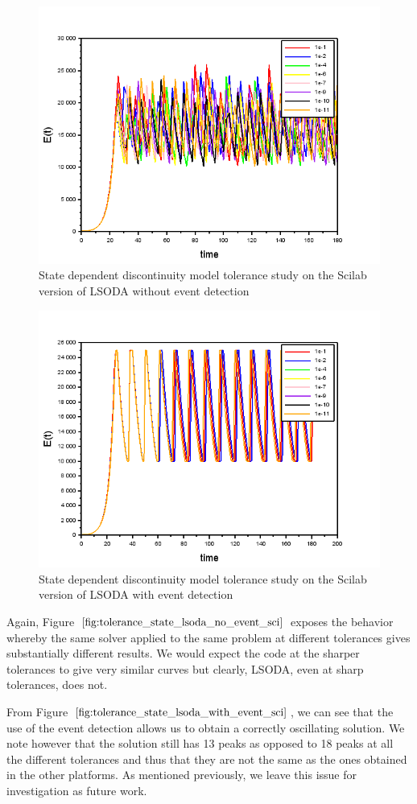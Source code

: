 \begin{figure}[h]
\centering
\includegraphics[width=0.7\linewidth]{./figures/tolerance_state_lsoda_no_event_sci}
\caption{State dependent discontinuity model tolerance study on the Scilab version of LSODA without event detection}
\label{fig:tolerance_state_lsoda_no_event_sci}
\end{figure}

\begin{figure}[h]
\centering
\includegraphics[width=0.7\linewidth]{./figures/tolerance_state_lsoda_with_event_sci}
\caption{State dependent discontinuity model tolerance study on the Scilab version of LSODA with event detection}
\label{fig:tolerance_state_lsoda_with_event_sci}
\end{figure}

Again, Figure $\ref{fig:tolerance_state_lsoda_no_event_sci}$ exposes the behavior whereby the same solver applied to the same problem at different tolerances gives substantially different results. We would expect the code at the sharper tolerances to give very similar curves but clearly, LSODA, even at sharp tolerances, does not.

From Figure $\ref{fig:tolerance_state_lsoda_with_event_sci}$, we can see that the use of the event detection allows us to obtain a correctly oscillating solution. We note however that the solution still has 13 peaks as opposed to 18 peaks at all the different tolerances and thus that they are not the same as the ones obtained in the other platforms. As mentioned previously, we leave this issue for investigation as future work.

